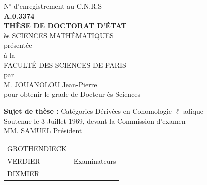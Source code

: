 \documentclass[12pt,twoside]{report} %
\begin{document}
\thispagestyle{empty}
\vspace*{\fill}
\begin{center}
    {\large N$^\circ$ d'enregistrement au C.N.R.S} \\
    \vspace{0.5em}
    {\bf A.0.3374} \\
    \vspace{4em}
    {\LARGE\bf THÈSE DE DOCTORAT D'ÉTAT} \\
    \vspace{0.5em}
    {\large ès SCIENCES MATHÉMATIQUES} \\
    \vspace{1em}
    présentée \\
    à la \\
    FACULTÉ DES SCIENCES DE PARIS \\
    \vspace{2em}
    par \\
    \vspace{2em}
    {\Large M. JOUANOLOU Jean-Pierre} \\
    \vspace{1em}
    pour obtenir le grade de Docteur ès-Sciences \\
\end{center}
\vspace*{\fill}
\begin{center}
    {\bf Sujet de thèse :} {\Large Catégories Dérivées en Cohomologie $\ell$-adique} \\
    \vspace{1em}
    Soutenue le 3 Juillet 1969, devant la Commission d'examen \\
    \vspace{1em}
    MM. SAMUEL \quad\quad Président \\
    \vspace{0.5em}
\begin{tabular}{@{}l@{\hspace{3cm}}r@{}}
GROTHENDIECK & \\
VERDIER & Examinateurs \\
DIXMIER & \\
\end{tabular}
\end{center}
\vspace*{\fill}

\newpage
\thispagestyle{empty}
\mbox{}


\renewcommand{\contentsname}{TABLE DES MATIÈRES}
\tableofcontents\thispagestyle{empty}

\setcounter{page}{1}


















\newpage
\mbox{}
\thispagestyle{empty}
\end{document}
